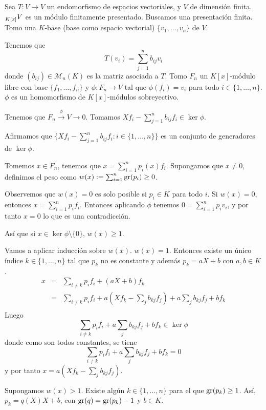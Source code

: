 \begin{ejemplo}
  Sea \(T:V\longrightarrow V\) un endomorfismo de espacios vectoriales,
  y \(V\) de dimensión finita. \(\prescript{}{K[x]}{V}\) es un módulo
  finitamente presentado. Buscamos una presentación finita.
  Tomo una
  \(K\)-base (base como espacio vectorial)
  \(\{v_1,\ldots, v_n\}\) de \(V\).

  Tenemos que
  \[
    T(v_i)=\sum_{j=1}^n b_{ij} v_i
  \]
  donde \((b_{ij})\in\mathcal{M}_n(K)\) es la matriz asociada a \(T\). Tomo
  \(F_n\) un \(K[x]\)-módulo libre con base \(\{f_1,\ldots, f_n\}\)
  y \(\phi: F_n\longrightarrow V\) tal que \(\phi(f_i)=v_i\)
  para todo \(i\in\{1,\ldots,n\}\). \(\phi\) es un homomorfismo de
  \(K[x]\)-módulos sobreyectivo.

  Tenemos que \(F_n\overset{\phi}{\longrightarrow} V\longrightarrow 0\).
  Tomamos \(Xf_i-\sum_{j=1}^n b_{ij}f_i\in\ker\phi\).

  Afirmamos que \(\{Xf_i-\sum_{j=1}^n b_{ij}f_i:i\in\{1,\ldots,n\}\}\)
  es un conjunto de generadores de \(\ker\phi\).

  Tomemos \(x\in F_n\), tenemos que \(x=\sum_{i=1}^n p_i(x)f_i\). Supongamos
  que \(x\neq 0\), definimos el peso como \(w(x):=\sum_{i=1}^n \operatorname{gr}(p_i)\ge 0\).

  Observemos que \(w(x)=0\) es solo posible si \(p_i\in K\) para todo \(i\).
  Si \(w(x)=0\), entonces \(x=\sum_{i=1}^n p_i f_i\).
  Entonces aplicando \(\phi\) tenemos
  \(0=\sum_{i=1}^n p_i v_i\), y por tanto \(x=0\) lo que es una contradicción.

  Así que si \(x\in\ker\phi\setminus\{0\}\), \(w(x)\ge 1\).

  Vamos a aplicar inducción sobre \(w(x)\). \(w(x)=1\). Entonces existe un
  único índice \(k\in\{1,\ldots,n\}\) tal que \(p_k\) no es constante
  y además \(p_k=aX+b\) con \(a,b\in K\).
  \begin{eqnarray*}
    x&=&\sum_{i\neq k} p_i f_i + (aX+b)f_k\\
     &=&\sum_{i\neq k} p_i f_i + a(Xf_k-\sum_j b_{kj}f_j)+a\sum_j b_{kj}f_j
         +bf_k\\
  \end{eqnarray*}
  Luego
  \[
    \sum_{i\neq k}p_i f_i+a\sum_j b_{kj}f_j+bf_k\in\ker\phi
  \]
  donde como son todos constantes, se tiene
  \[
    \sum_{i\neq k}p_i f_i+a\sum_j b_{kj}f_j+bf_k=0
  \]
  y por tanto \(x=a(Xf_k-\sum_j b_{kj}f_j)\).

  Supongamos \(w(x)>1\). Existe algún \(k\in\{1,\ldots,n\}\) para el que
  \(\operatorname{gr}(p_k)\ge 1\). Así, \(p_k=q(X)X+b\), con \(\operatorname{gr}(q)=\operatorname{gr}(p_k)-1\) y
  \(b\in K\).


\end{ejemplo}
